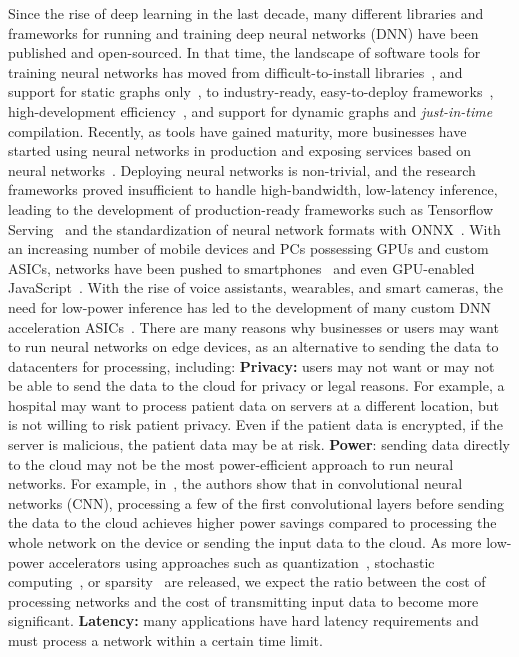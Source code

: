 

Since the rise of deep learning in the last decade, many different libraries and frameworks for running and training deep neural networks  
(DNN) have been published and open-sourced. In that time, the landscape of software tools for training neural networks has moved from 
difficult-to-install libraries~, and support for static graphs only~, to industry-ready, easy-to-deploy 
frameworks~, high-development efficiency~, and support for dynamic graphs and \textit{just-in-time} compilation. 
Recently, as tools have gained maturity, more businesses have started using neural networks in production and exposing services
based on neural networks~. Deploying neural networks is non-trivial, and the research frameworks proved insufficient 
to handle high-bandwidth, low-latency inference, leading to the development of production-ready frameworks such as Tensorflow 
Serving~ and the standardization of neural network formats with ONNX~. With an increasing number of 
mobile devices and PCs possessing GPUs and custom ASICs, networks have been pushed to smartphones~ and even 
GPU-enabled JavaScript~. With the rise of voice assistants, wearables, and smart cameras, 
the need for low-power inference has led to the development of many custom DNN acceleration ASICs~. 
There are many reasons why businesses or users may want to run neural networks on edge devices, 
as an alternative to sending the data to datacenters for processing, including: 
\noindent \textbf{Privacy:} users may not want or may not be able to send the data to the cloud for privacy or legal reasons. 
For example, a hospital may want to process patient data on servers at a different location, but is not willing to risk patient 
privacy. Even if the patient data is encrypted, if the server is malicious, the patient data may be at risk. 
\noindent \textbf{Power}: sending data directly to the cloud may not be the most power-efficient approach to run neural networks.
For example, in~, the authors show that in convolutional neural networks (CNN), processing a few of the first 
convolutional layers before sending the data to the cloud achieves higher power savings compared to processing the whole 
network on the device or sending the input data to the cloud. As more low-power accelerators using approaches such as 
quantization~, stochastic computing~, or 
sparsity~ are released, we expect the ratio between the cost of processing 
networks and the cost of transmitting input data to become more significant.
\noindent \textbf{Latency:} many applications have hard latency requirements and must process a network within a certain time limit.
